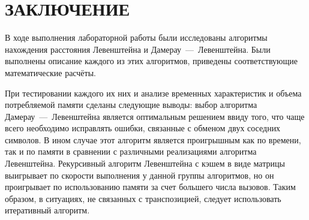 \part*{ЗАКЛЮЧЕНИЕ}

В ходе выполнения лабораторной работы были исследованы алгоритмы нахождения расстояния Левенштейна и Дамерау~---~Левенштейна. Были выполнены описание каждого из этих алгоритмов, приведены соответствующие математические расчёты.  

При тестировании каждого их них и анализе временных характеристик и объема потребляемой памяти сделаны следующие выводы: выбор алгоритма Дамерау~---~Левенштейна является оптимальным решением ввиду того, что чаще всего необходимо исправлять ошибки, связанные с обменом двух соседних символов. В ином случае этот алгоритм является проигрышным как по времени, так и по памяти в сравнении с различными реализациями алгоритма Левенштейна. Рекурсивный алгоритм Левенштейна с кэшем в виде матрицы выигрывает по скорости выполнения у данной группы алгоритмов, но он проигрывает по использованию памяти за счет большего числа вызовов. Таким образом, в ситуациях, не связанных с транспозицией, следует использовать итеративный алгоритм.